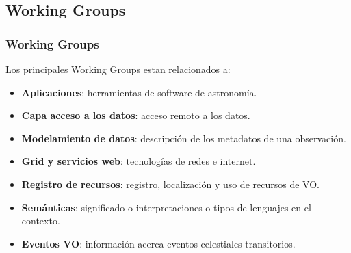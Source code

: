 \subsection{Working Groups}
\begin{frame}
\frametitle{Working Groups}
\begin{multicols}{2}
Los principales Working Groups estan relacionados a:
\begin{itemize}
	\item <2-> \textbf{Aplicaciones}: herramientas de software de astronomía.
	\item <3-> \textbf{Capa acceso a los datos}: acceso remoto a los datos.
	\item <4-> \textbf{Modelamiento de datos}: descripción de los metadatos de una observación.
	\item <5-> \textbf{Grid y servicios web}: tecnologías de redes e internet.
	\item <6-> \textbf{Registro de recursos}: registro, localización y uso de recursos de VO.
	\item <7-> \textbf{Semánticas}: significado o interpretaciones o tipos de lenguajes en el contexto.
	\item <8-> \textbf{Eventos VO}: información acerca eventos celestiales transitorios.
\end{itemize}

\end{multicols}
\end{frame}
